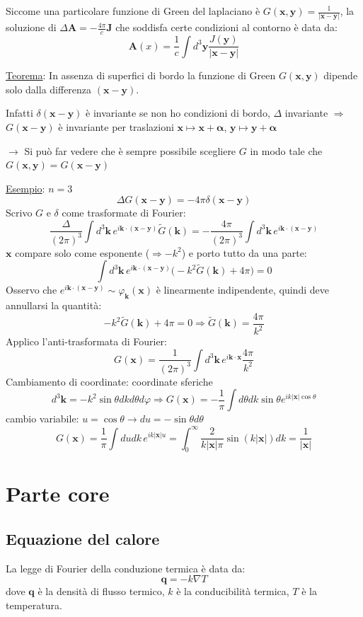 \documentclass[a4paper,11pt]{report}
\newcommand{\vect}[1]{\boldsymbol{#1}}
\newcommand{\x}{\boldsymbol{x}}
\newcommand{\y}{\boldsymbol{y}}
\newcommand{\kk}{\boldsymbol{k}}
\begin{document}
Siccome una particolare funzione di Green del laplaciano \`e $G(\x,\y)=\frac{1}{|\x-\y|}$, la soluzione di $\Delta \vect{A}=-\frac{4 \pi}{c} \vect{J}$ che soddisfa certe condizioni al contorno \`e data da:
\[
\vect{A}(x)=\frac{1}{c} \int d^3 \y \frac{J(\y)}{|\x-\y|}
\]

\medskip

\underline{Teorema}: In assenza di superfici di bordo la funzione di Green $G(\x,\y)$ dipende solo dalla differenza $(\x-\y)$.

Infatti $\delta(\x-\y)$ \`e invariante se non ho condizioni di bordo, $\Delta$ invariante $\Rightarrow$ $G(\x-\y)$ \`e invariante per traslazioni $\x \mapsto \x+\vect{\alpha}$, $\y \mapsto \y+\vect{\alpha}$

$\rightarrow$ Si pu\`o far vedere che \`e sempre possibile scegliere $G$ in modo tale che $G(\x,\y)=G(\x-\y)$

\medskip

\underline{Esempio}: $n=3$
\[
\Delta G(\x-\y)=-4\pi\delta(\x-\y)
\]
Scrivo $G$ e $\delta$ come trasformate di Fourier:
\[
\frac{\Delta}{(2\pi)^3}\int d^3\kk \,e^{i\kk\cdot(\x-\y)}\tilde{G}(\kk)=-\frac{4\pi}{(2\pi)^3}\int d^3\kk\, e^{i\kk\cdot(\x-\y)}
\]
$\x$ compare solo come esponente ($\Rightarrow -k^2$) e porto tutto da una parte:
\[
\int d^3\kk\, e^{i\kk\cdot(\x-\y)}\big(-k^2\tilde{G}(\kk)+4\pi \big)=0
\]
Osservo che $e^{i\kk\cdot(\x-\y)}\sim\varphi_{\kk}(\x)$ \`e linearmente indipendente, quindi deve annullarsi la quantit\`a:
\[
-k^2\tilde{G}(\kk)+4\pi =0 \Rightarrow \tilde{G}(\kk)=\frac{4\pi}{k^2}
\]
Applico l'anti-trasformata di Fourier:
\[
G(\x)=\frac{1}{(2\pi)^3}\int d^3\kk\, e^{i\kk\cdot\x}\frac{4\pi}{k^2}
\]
Cambiamento di coordinate: coordinate sferiche
\[
d^3\kk=-k^2\sin\theta dk d\theta d\varphi \Rightarrow G(\x)=-\frac{1}{\pi}\int d\theta dk \sin\theta e^{ik|\x|\cos\theta}
\]
cambio variabile: $u=\cos\theta \rightarrow du=-\sin\theta d\theta$
\[
G(\x)=\frac{1}{\pi}\int du dk \, e^{ik|\x|u}=\int_0^{\infty}\frac{2}{k|\x|\pi}\sin(k|\x|)dk= \frac{1}{|\x|}
\]

\chapter{Parte core}

\section{Equazione del calore}

La legge di Fourier della conduzione termica \`e data da:
\begin{equation}
\vect{q} =-k\nabla T
\label{2.1}
\end{equation}
dove $\vect{q}$ \`e la densit\`a di flusso termico, $k$ \`e la conducibilit\`a termica, $T$ \`e la temperatura.
\end{document}
